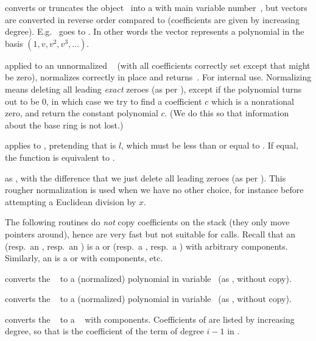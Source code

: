  converts or truncates the object~
into a  with main variable number~, but vectors are converted
in reverse order compared to  (coefficients are given by
increasing degree). E.g.~\kbd{[2,3]} goes to . In other words
the vector represents a polynomial in the basis $(1,v,v^2,v^3,\dots)$.

 applied to an unnormalized ~
(with all coefficients correctly set except that  might
be zero), normalizes  correctly in place and returns~. For
internal use. Normalizing means deleting all leading \emph{exact} zeroes
(as per ), except if the polynomial turns out to be $0$,
in which case we try to find a coefficient $c$ which is a nonrational zero,
and return the constant polynomial $c$. (We do this so that information
about the base ring is not lost.)

 applies  to
, pretending that  is $l$, which must be less than
or equal to . If equal, the function is equivalent to
.

 as ,
with the difference that we just delete all leading zeroes (as per
). This rougher normalization is used when we have no other
choice, for instance before attempting a Euclidean division by $x$.

The following routines do \emph{not} copy coefficients on the stack (they
only move pointers around), hence are very fast but not suitable for
 calls. Recall that an  (resp.~an , resp.~an
) is a  or  (resp.~a , resp.~a )
with arbitrary components. Similarly, an  is a  or
 with  components, etc.

 converts the ~ to a
(normalized) polynomial in variable~ (as , without
copy).

 converts the ~
to a (normalized) polynomial in variable~ (as ,
without copy).

 converts the ~ to a
~ with  components. Coefficients of  are listed
by increasing degree, so that  is the coefficient of the term of
degree $i-1$ in .

